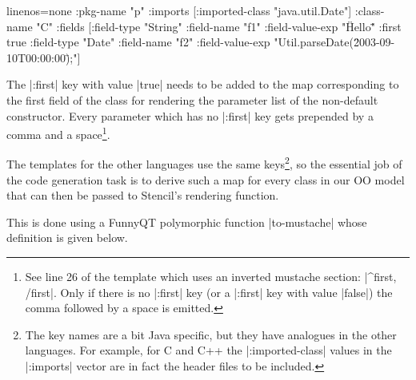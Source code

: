 \documentclass[submission]{eptcs}
\newcommand{\code}{\clojureinline}
\begin{document}
\begin{clojurecode*}{linenos=none}
  {:pkg-name "p"
   :imports [{:imported-class "java.util.Date"}]
   :class-name "C"
   :fields [{:field-type "String"
             :field-name "f1"
             :field-value-exp "\"Hello\""
             :first true}
            {:field-type "Date"
             :field-name "f2"
             :field-value-exp "Util.parseDate(\"2003-09-10T00:00:00\");"}]}
\end{clojurecode*}

The \code|:first| key with value \code|true| needs to be added to the map
corresponding to the first field of the class for rendering the parameter list
of the non-default constructor.  Every parameter which has no \code|:first| key
gets prepended by a comma and a space\footnote{See line 26 of the template
  which uses an inverted mustache section: \javainline|{{^first}}, {{/first}}|.
  Only if there is no \code|:first| key (or a \code|:first| key with value
  \code|false|) the comma followed by a space is emitted.}.

The templates for the other languages use the same keys\footnote{The key names
  are a bit Java specific, but they have analogues in the other languages.  For
  example, for C and C++ the \code|:imported-class| values in the
  \code|:imports| vector are in fact the header files to be included.}, so the
essential job of the code generation task is to derive such a map for every
class in our OO model that can then be passed to Stencil's rendering function.

This is done using a FunnyQT polymorphic function \code|to-mustache| whose
definition is given below.

\end{document}
